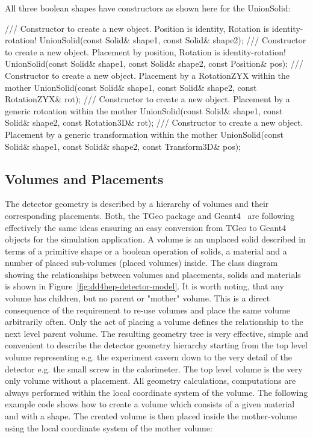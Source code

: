 \documentclass[10pt,a4paper]{article}
\begin{document}
\noindent
All three boolean shapes
have constructors as shown here for the UnionSolid:
\begin{code}
  /// Constructor to create a new object. Position is identity, Rotation is identity-rotation!
  UnionSolid(const Solid& shape1, const Solid& shape2);
  /// Constructor to create a new object. Placement by position, Rotation is identity-rotation!
  UnionSolid(const Solid& shape1, const Solid& shape2, const Position& pos);
  /// Constructor to create a new object. Placement by a RotationZYX within the mother
  UnionSolid(const Solid& shape1, const Solid& shape2, const RotationZYX& rot);
  /// Constructor to create a new object. Placement by a generic rotoation within the mother
  UnionSolid(const Solid& shape1, const Solid& shape2, const Rotation3D& rot);
  /// Constructor to create a new object. Placement by a generic transformation within the mother
  UnionSolid(const Solid& shape1, const Solid& shape2, const Transform3D& pos);
\end{code}


\newpage
\subsection{Volumes and Placements}
\noindent
The detector geometry is described by a hierarchy of volumes and their 
corresponding placements. Both, the TGeo package and Geant4~\cite{bib:geant4} 
are following effectively the same ideas ensuring an easy conversion from 
TGeo to Geant4 objects for the simulation application.
\noindent
A volume is an unplaced solid de\-scribed in terms of a primitive 
shape or a boolean operation of solids, a material and a number of
placed sub-volumes (placed volumes) inside. The class diagram showing the 
relationships between volumes and placements, solids and materials is shown 
in Figure~\ref{fig:dd4hep-detector-model}.
\noindent
It is worth noting, that any volume has children, but no parent or "mother"
volume. This is a direct consequence of the requirement to re-use volumes
and place the same volume arbitrarily often. Only the act of placing a volume
defines the relationship to the next level parent volume.
The resulting geometry tree is very effective, simple and convenient to 
describe the detector geometry hierarchy starting from the top level volume
representing e.g. the experiment cavern down to the very detail of the detector
e.g. the small screw in the calorimeter. The top level volume is the very only
volume without a placement. All geometry calculations, computations are always 
performed within the local coordinate system of the volume.
The following example code shows how to create
a volume which consists of a given material and with a shape. The created volume 
is then placed inside the mother-volume using the local coordinate system of the
mother volume:
\end{document}
